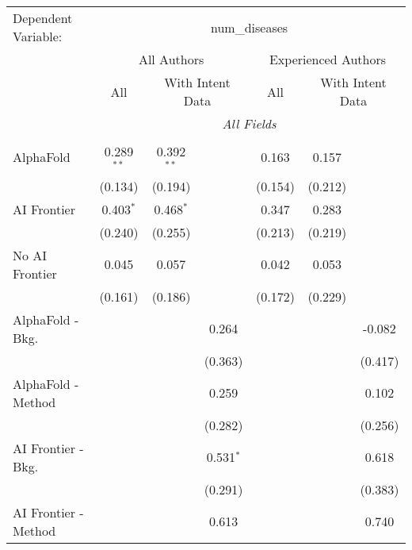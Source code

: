 \begingroup
\centering
\begin{tabular}{lcccccc}
   \tabularnewline \midrule \midrule
   Dependent Variable: & \multicolumn{6}{c}{num\_diseases}\\
 & \multicolumn{3}{c}{All Authors} & \multicolumn{3}{c}{Experienced Authors} \\
\cmidrule(lr){2-4} \cmidrule(lr){5-7}
 & \multicolumn{1}{c}{All} & \multicolumn{2}{c}{With Intent Data} & \multicolumn{1}{c}{All} & \multicolumn{2}{c}{With Intent Data} \\
\cmidrule(lr){2-2} \cmidrule(lr){3-4} \cmidrule(lr){5-5} \cmidrule(lr){6-7}
 & \multicolumn{6}{c}{\textit{All Fields}} \\ \\
   AlphaFold               & 0.289$^{**}$ & 0.392$^{**}$ &             & 0.163   & 0.157   &   \\   
                           & (0.134)      & (0.194)      &             & (0.154) & (0.212) &   \\   
   AI Frontier             & 0.403$^{*}$  & 0.468$^{*}$  &             & 0.347   & 0.283   &   \\   
                           & (0.240)      & (0.255)      &             & (0.213) & (0.219) &   \\   
   No AI Frontier          & 0.045        & 0.057        &             & 0.042   & 0.053   &   \\   
                           & (0.161)      & (0.186)      &             & (0.172) & (0.229) &   \\   
   AlphaFold - Bkg.        &              &              & 0.264       &         &         & -0.082\\   
                           &              &              & (0.363)     &         &         & (0.417)\\   
   AlphaFold - Method      &              &              & 0.259       &         &         & 0.102\\   
                           &              &              & (0.282)     &         &         & (0.256)\\   
   AI Frontier - Bkg.      &              &              & 0.531$^{*}$ &         &         & 0.618\\   
                           &              &              & (0.291)     &         &         & (0.383)\\   
   AI Frontier - Method    &              &              & 0.613       &         &         & 0.740\\   

\end{tabular}

